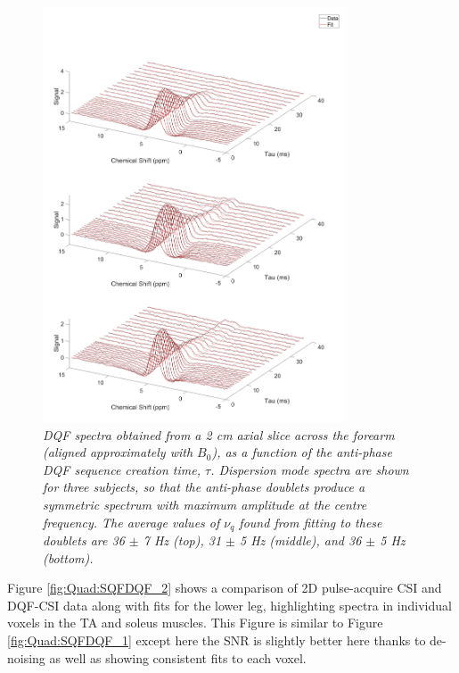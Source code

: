 \begin{figure}
    \centering
    \includegraphics[width=0.8\textwidth]{Figures/Quad/Bulk_DQF_2.png}
    \caption{\textit{\ac{DQF} spectra obtained from a 2 cm axial slice across the forearm (aligned approximately with $B_0$), as a function of the anti-phase \ac{DQF} sequence creation time, $\tau$. Dispersion mode spectra are shown for three subjects, so that the anti-phase doublets produce a symmetric spectrum with maximum amplitude at the centre frequency. The average values of $\nu_q$ found from fitting to these doublets are 36 $\pm$ 7 Hz (top), 31 $\pm$ 5 Hz (middle), and 36 $\pm$ 5 Hz (bottom).}}
    \label{fig:Quad:Bulk_DQF_2}
\end{figure}

Figure \ref{fig:Quad:SQFDQF_2} shows a comparison of 2D pulse-acquire \ac{CSI} and \ac{DQF}-\ac{CSI} data along with fits for the lower leg, highlighting spectra in individual voxels in the \ac{TA} and soleus muscles. This Figure is similar to Figure \ref{fig:Quad:SQFDQF_1} except here the \ac{SNR} is slightly better here thanks to de-noising as well as showing consistent fits to each voxel.

